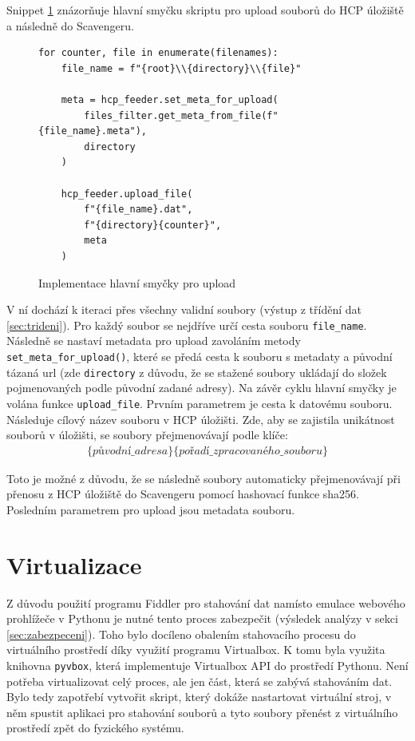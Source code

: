 \documentclass[thesis=M,czech,hidelinks]{FITthesis}[2013/05/06]
\begin{document}
Snippet \ref{snip:mainupload} znázorňuje hlavní smyčku skriptu pro upload souborů do HCP úložiště a následně do Scavengeru.
\begin{figure}[h]               
	\begin{verbatim}
for counter, file in enumerate(filenames):
    file_name = f"{root}\\{directory}\\{file}"

    meta = hcp_feeder.set_meta_for_upload(
        files_filter.get_meta_from_file(f"{file_name}.meta"),
        directory
    )

    hcp_feeder.upload_file(
        f"{file_name}.dat",
        f"{directory}{counter}",
        meta
    )
	\end{verbatim}      
	\caption{Implementace hlavní smyčky pro upload}
	\label{snip:mainupload}
\end{figure}
V ní dochází k iteraci přes všechny validní soubory (výstup z třídění dat \ref{sec:trideni}). Pro každý soubor se nejdříve určí cesta souboru \texttt{file_name}. Následně se nastaví metadata pro upload zavoláním metody \texttt{set_meta_for_upload()}, které se předá cesta k souboru s metadaty a původní tázaná url (zde \texttt{directory} z důvodu, že se stažené soubory ukládají do složek pojmenovaných podle původní zadané adresy). Na závěr cyklu hlavní smyčky je volána funkce \texttt{upload_file}. Prvním parametrem je cesta k datovému souboru. Následuje cílový název souboru v HCP úložišti. Zde, aby se zajistila unikátnost souborů v úložišti, se soubory přejmenovávají podle klíče:
\begin{eqnarray}\label{prejmenovavani}
\{původní\_ adresa\}\{pořadí\_ zpracovaného\_ souboru\}
\end{eqnarray}

 Toto je možné z důvodu, že se následně soubory automaticky přejmenovávají při přenosu z HCP úložiště do Scavengeru pomocí hashovací funkce sha256. Posledním parametrem pro upload jsou metadata souboru.

\section{Virtualizace}
Z důvodu použití programu Fiddler pro stahování dat namísto emulace webového prohlížeče v Pythonu je nutné tento proces zabezpečit (výsledek analýzy v sekci \ref{sec:zabezpeceni}). Toho bylo docíleno obalením stahovacího procesu do virtuálního prostředí díky využití programu Virtualbox. K tomu byla využita knihovna \texttt{pyvbox}\cite{pyvbox}, která implementuje Virtualbox API do prostředí Pythonu. Není potřeba virtualizovat celý proces, ale jen část, která se zabývá stahováním dat. Bylo tedy zapotřebí vytvořit skript, který dokáže nastartovat virtuální stroj, v něm spustit aplikaci pro stahování souborů a tyto soubory přenést z virtuálního prostředí zpět do fyzického systému.
\end{document}
